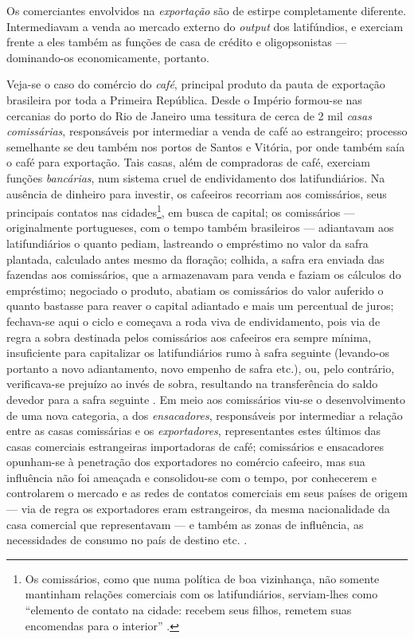 Os comerciantes envolvidos na \textit{exportação} são de estirpe completamente diferente. Intermediavam a venda ao mercado externo do \textit{output} dos latifúndios, e exerciam frente a eles também as funções de casa de crédito e oligopsonistas --- dominando-os economicamente, portanto. 

Veja-se o caso do comércio do \textit{café}, principal produto da pauta de exportação brasileira por toda a Primeira República. Desde o Império formou-se nas cercanias do porto do Rio de Janeiro uma tessitura de cerca de 2 mil \textit{casas comissárias}, responsáveis por intermediar a venda de café ao estrangeiro; processo semelhante se deu também nos portos de Santos e Vitória, por onde também saía o café para exportação. Tais casas, além de compradoras de café, exerciam funções \textit{bancárias}, num sistema cruel de endividamento dos latifundiários. Na ausência de dinheiro para investir, os cafeeiros recorriam aos comissários, seus principais contatos nas cidades\footnote{Os comissários, como que numa política de boa vizinhança, não somente mantinham relações comerciais com os latifundiários, serviam-lhes como ``elemento de contato na cidade: recebem seus filhos, remetem suas encomendas para o interior'' \cite[p.~36]{CARONE1970inst}.}, em busca de capital; os comissários --- originalmente portugueses, com o tempo também brasileiros --- adiantavam aos latifundiários o quanto pediam, lastreando o empréstimo no valor da safra plantada, calculado antes mesmo da floração; colhida, a safra era enviada das fazendas aos comissários, que a armazenavam para venda e faziam os cálculos do empréstimo; negociado o produto, abatiam os comissários do valor auferido o quanto bastasse para reaver o capital adiantado e mais um percentual de juros; fechava-se aqui o ciclo e começava a roda viva de endividamento, pois via de regra a sobra destinada pelos comissários aos cafeeiros era sempre mínima, insuficiente para capitalizar os latifundiários rumo à safra seguinte (levando-os portanto a novo adiantamento, novo empenho de safra etc.), ou, pelo contrário, verificava-se prejuízo ao invés de sobra, resultando na transferência do saldo devedor para a safra seguinte \cite[pp.~36-37]{CARONE1970inst}. Em meio aos comissários viu-se o desenvolvimento de uma nova categoria, a dos \textit{ensacadores}, responsáveis por intermediar a relação entre as casas comissárias e os \textit{exportadores}, representantes estes últimos das casas comerciais estrangeiras importadoras de café; comissários e ensacadores opunham-se à penetração dos exportadores no comércio cafeeiro, mas sua influência não foi ameaçada e consolidou-se com o tempo, por conhecerem e controlarem o mercado e as redes de contatos comerciais em seus países de origem --- via de regra os exportadores eram estrangeiros, da mesma nacionalidade da casa comercial que representavam --- e também as zonas de influência, as necessidades de consumo no país de destino etc. \cite[pp.~37-38]{CARONE1970inst}.


